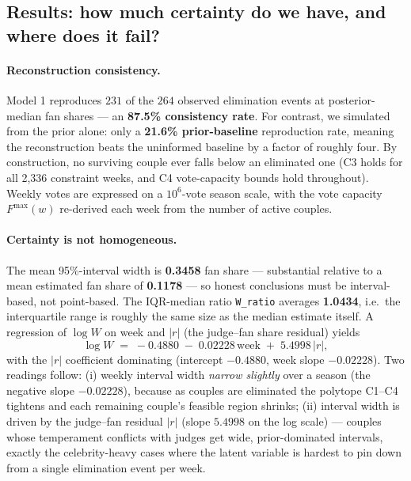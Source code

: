 \documentclass[11pt]{article}
\begin{document}
\subsection{Results: how much certainty do we have, and where does it fail?}

\paragraph{Reconstruction consistency.} Model 1 reproduces $231$ of the $264$ observed
elimination events at posterior-median fan shares --- an \textbf{87.5\% consistency rate}.
For contrast, we simulated from the prior alone: only a \textbf{21.6\%
prior-baseline} reproduction rate, meaning the reconstruction beats the uninformed
baseline by a factor of roughly four. By construction, no surviving couple ever falls
below an eliminated one (C3 holds for all 2{,}336 constraint weeks, and C4 vote-capacity
bounds hold throughout). Weekly votes are expressed on a $10^6$-vote season scale, with
the vote capacity $F^{\max}(w)$ re-derived each week from the number of active couples.

\paragraph{Certainty is not homogeneous.} The mean 95\%-interval width is
\textbf{0.3458} fan share --- substantial relative to a mean estimated fan share of
\textbf{0.1178} --- so honest conclusions must be interval-based, not point-based.
The IQR-median ratio \texttt{W\_ratio} averages \textbf{1.0434}, i.e.\ the interquartile
range is roughly the same size as the median estimate itself. A regression of
$\log W$ on week and $|r|$ (the judge--fan share residual) yields
\begin{equation}
\log W \;=\; -0.4880 \;-\; 0.02228\,\text{week} \;+\; 5.4998\,|r|,
\end{equation}
with the $|r|$ coefficient dominating (intercept $-0.4880$, week slope $-0.02228$). Two
readings follow: (i) weekly interval width \emph{narrow slightly} over a season (the
negative slope $-0.02228$), because as couples are eliminated the polytope C1--C4 tightens
and each remaining couple's feasible region shrinks; (ii) interval width is driven by the
judge--fan residual $|r|$ (slope $5.4998$ on the log scale) --- couples whose temperament
conflicts with judges get wide, prior-dominated intervals, exactly the celebrity-heavy
cases where the latent variable is hardest to pin down from a single elimination event
per week.
\end{document}
